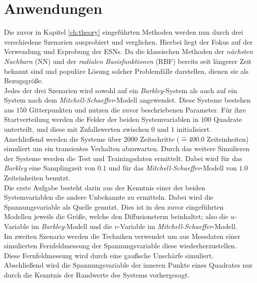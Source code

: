 \chapter{Anwendungen}
\label{ch:experiments}

Die zuvor in Kapitel \ref{ch:theory} eingeführten Methoden werden nun durch drei verschiedene Szenarien ausprobiert und verglichen. Hierbei liegt der Fokus auf der Verwendung und Erprobung der \textsc{ESN}s. Da die klassischen Methoden der \textit{nächsten Nachbarn} (\textsc{NN}) und der \textit{radialen Basisfunktionen} (\textsc{RBF}) bereits seit längerer Zeit bekannt sind und populäre Lösung solcher Problemfälle darstellen, dienen sie als Bezugsgröße.\\

Jedes der drei Szenarien wird sowohl auf ein \textit{Barkley}-System als auch auf ein System nach dem \textit{Mitchell-Schaeffer}-Modell angewendet. Diese Systeme bestehen aus $150$ Gitterpunkten und nutzen die zuvor beschriebenen Parameter. Für ihre Startverteilung werden die Felder der beiden Systemvariablen in $100$ Quadrate unterteilt, und diese mit Zufallswerten zwischen $0$ und $1$ initialisiert. Anschließend werden die Systeme über $2000$ Zeitschritte ($\widehat{=} 400.0$ Zeiteinheiten) simuliert um ein transientes Verhalten abzuwarten. Durch das weitere Simulieren der Systeme werden die Test und Trainingsdaten ermittelt. Dabei wird für das \textit{Barkley} eine Samplingzeit von $0.1$ und für das \textit{Mitchell-Schaeffer}-Modell von $1.0$ Zeiteinheiten benutzt.\\
 
Die erste Aufgabe besteht darin aus der Kenntnis einer der beiden Systemvariablen die andere Unbekannte zu ermitteln. Dabei wird die Spannungsvariable als Quelle genutzt. Dies ist in den zuvor eingeführten Modellen jeweils die Größe, welche den Diffusionsterm beinhaltet; also die $u$-Variable im \textit{Barkley}-Modell und die $v$-Variable im \textit{Mitchell-Schaeffer}-Modell.\\
Im zweiten Szenario werden die Techniken verwendet um aus Messdaten einer simulierten Fernfeldmessung der Spannungsvariable  diese wiederherzustellen. Diese Fernfeldmessung wird durch eine gaußsche Unschärfe simuliert.\\
Abschließend wird die Spannungsvariable der inneren Punkte eines Quadrates nur durch die Kenntnis der Randwerte des Systems vorhergesagt.\\

